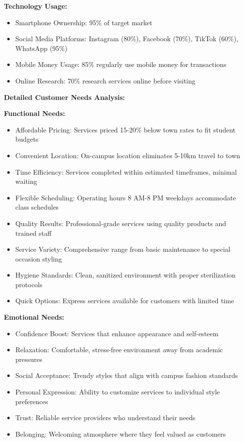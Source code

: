 \documentclass[a4paper,12pt]{article}
\begin{document}
\textbf{Technology Usage:}
\begin{itemize}[leftmargin=2em]
    \item Smartphone Ownership: 95\% of target market
    \item Social Media Platforms: Instagram (80\%), Facebook (70\%), TikTok (60\%), WhatsApp (95\%)
    \item Mobile Money Usage: 85\% regularly use mobile money for transactions
    \item Online Research: 70\% research services online before visiting
\end{itemize}

\vspace{1em}

\textbf{Detailed Customer Needs Analysis:}

\textbf{Functional Needs:}
\begin{itemize}[leftmargin=2em]
    \item Affordable Pricing: Services priced 15-20\% below town rates to fit student budgets
    \item Convenient Location: On-campus location eliminates 5-10km travel to town
    \item Time Efficiency: Services completed within estimated timeframes, minimal waiting
    \item Flexible Scheduling: Operating hours 8 AM-8 PM weekdays accommodate class schedules
    \item Quality Results: Professional-grade services using quality products and trained staff
    \item Service Variety: Comprehensive range from basic maintenance to special occasion styling
    \item Hygiene Standards: Clean, sanitized environment with proper sterilization protocols
    \item Quick Options: Express services available for customers with limited time
\end{itemize}

\textbf{Emotional Needs:}
\begin{itemize}[leftmargin=2em]
    \item Confidence Boost: Services that enhance appearance and self-esteem
    \item Relaxation: Comfortable, stress-free environment away from academic pressures
    \item Social Acceptance: Trendy styles that align with campus fashion standards
    \item Personal Expression: Ability to customize services to individual style preferences
    \item Trust: Reliable service providers who understand their needs
    \item Belonging: Welcoming atmosphere where they feel valued as customers
\end{itemize}
\end{document}
